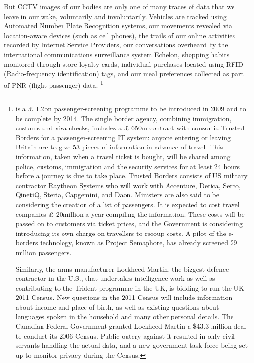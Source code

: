 {But CCTV images of our bodies are only one of many traces of data that
we leave in our wake, voluntarily and involuntarily. Vehicles are
tracked using Automated Number Plate Recognition systems, our movements
revealed via location{}-aware devices (such as cell phones), the trails
of our online activities recorded by Internet Service Providers, our
conversations overheard by the international communications
surveillance system Echelon, shopping habits monitored through store
loyalty cards, individual purchases located using RFID
(Radio{}-frequency identification) tags, and our meal preferences
collected as part of PNR (flight passenger) data. \footnote{ is a 
{£} 1.2bn passenger{}-screening programme to
be introduced in 2009 and to be complete by 2014. The single border
agency, combining immigration, customs and visa checks, includes a
{£} 650m contract with consortia Trusted Borders for a
passenger{}-screening IT system: anyone entering or leaving Britain are
to give 53 pieces of information in advance of travel. This
information, taken when a travel ticket is bought, will be shared among
police, customs, immigration and the security services for at least 24
hours before a journey is due to take place. Trusted Borders consists
of US military contractor Raytheon Systems who will work with
Accenture, Detica, Serco, QinetiQ, Steria, Capgemini, and Daon.
Ministers are also said to be considering the creation of a list of
 passengers. It is expected to cost travel companies
{£} 20million a year compiling the information. These costs will
be passed on to customers via ticket prices, and the Government is
considering introducing its own charge on travellers to recoup costs. A
pilot of the e{}-borders technology, known as Project Semaphore, has
already screened 29 million passengers.

Similarly, the arms manufacturer Lockheed Martin, the biggest defence
contractor in the U.S., that undertakes intelligence work as well as
contributing to the Trident programme in the UK, is bidding to run the
UK 2011 Census. New questions in the 2011 Census will include
information about income and place of birth, as well as existing
questions about languages spoken in the household and many other
personal details. The Canadian Federal Government granted Lockheed
Martin a \$43.3 million deal to conduct its 2006 Census. Public outcry
against it resulted in only civil servants handling the actual data,
and a new government task force being set up to monitor privacy during
the Census.

}}
